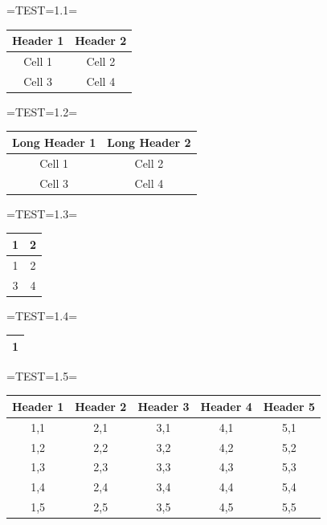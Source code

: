 \documentclass[a4paper]{article}
\begin{document}
=TEST=1.1=

\begin{table}[H]
\centering
\begin{tabular}{|cc|}
	\hline
	Header 1 & Header 2 \\
	\hline
	Cell 1 & Cell 2 \\
	Cell 3 & Cell 4 \\
	\hline
\end{tabular}
\end{table}

=TEST=1.2=

\begin{table}[H]
\centering
\begin{tabular}{|cc|}
	\hline
	Long Header 1 & Long Header 2 \\
	\hline
	Cell 1 & Cell 2 \\
	Cell 3 & Cell 4 \\
	\hline
\end{tabular}
\end{table}

=TEST=1.3=

\begin{table}[H]
\centering
\begin{tabular}{|cc|}
	\hline
	1 & 2 \\
	\hline
	1 & 2 \\
	3 & 4 \\
	\hline
\end{tabular}
\end{table}

=TEST=1.4=

\begin{table}[H]
\centering
\begin{tabular}{|c|}
	\hline
	1 \\
	\hline
\end{tabular}
\end{table}

=TEST=1.5=

\begin{table}[H]
\centering
\begin{tabular}{|ccccc|}
	\hline
	Header 1 & Header 2 & Header 3 & Header 4 & Header 5 \\
	\hline
	1,1 & 2,1 & 3,1 & 4,1 & 5,1 \\
	1,2 & 2,2 & 3,2 & 4,2 & 5,2 \\
	1,3 & 2,3 & 3,3 & 4,3 & 5,3 \\
	1,4 & 2,4 & 3,4 & 4,4 & 5,4 \\
	1,5 & 2,5 & 3,5 & 4,5 & 5,5 \\
	\hline
\end{tabular}
\end{table}
\end{document}
